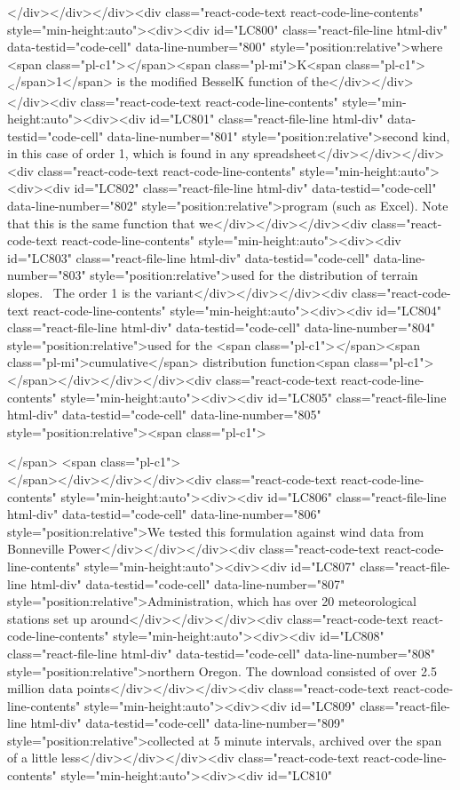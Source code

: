 {{{{{</div></div></div><div class="react-code-text react-code-line-contents" style="min-height:auto"><div><div id="LC800" class="react-file-line html-div" data-testid="code-cell" data-line-number="800" style="position:relative">where <span class="pl-c1">\emph</span>{<span class="pl-mi">K<span class="pl-c1">\textsubscript</span>{1}</span>} is the modified BesselK function of the</div></div></div><div class="react-code-text react-code-line-contents" style="min-height:auto"><div><div id="LC801" class="react-file-line html-div" data-testid="code-cell" data-line-number="801" style="position:relative">second kind, in this case of order 1, which is found in any spreadsheet</div></div></div><div class="react-code-text react-code-line-contents" style="min-height:auto"><div><div id="LC802" class="react-file-line html-div" data-testid="code-cell" data-line-number="802" style="position:relative">program (such as Excel). Note that this is the same function that we</div></div></div><div class="react-code-text react-code-line-contents" style="min-height:auto"><div><div id="LC803" class="react-file-line html-div" data-testid="code-cell" data-line-number="803" style="position:relative">used for the distribution of terrain slopes.~ The order 1 is the variant</div></div></div><div class="react-code-text react-code-line-contents" style="min-height:auto"><div><div id="LC804" class="react-file-line html-div" data-testid="code-cell" data-line-number="804" style="position:relative">used for the <span class="pl-c1">\emph</span>{<span class="pl-mi">cumulative</span>} distribution function<span class="pl-c1">\\</span></div></div></div><div class="react-code-text react-code-line-contents" style="min-height:auto"><div><div id="LC805" class="react-file-line html-div" data-testid="code-cell" data-line-number="805" style="position:relative"><span class="pl-c1">\strut</span> <span class="pl-c1">\\</span></div></div></div><div class="react-code-text react-code-line-contents" style="min-height:auto"><div><div id="LC806" class="react-file-line html-div" data-testid="code-cell" data-line-number="806" style="position:relative">We tested this formulation against wind data from Bonneville Power</div></div></div><div class="react-code-text react-code-line-contents" style="min-height:auto"><div><div id="LC807" class="react-file-line html-div" data-testid="code-cell" data-line-number="807" style="position:relative">Administration, which has over 20 meteorological stations set up around</div></div></div><div class="react-code-text react-code-line-contents" style="min-height:auto"><div><div id="LC808" class="react-file-line html-div" data-testid="code-cell" data-line-number="808" style="position:relative">northern Oregon. The download consisted of over 2.5 million data points</div></div></div><div class="react-code-text react-code-line-contents" style="min-height:auto"><div><div id="LC809" class="react-file-line html-div" data-testid="code-cell" data-line-number="809" style="position:relative">collected at 5 minute intervals, archived over the span of a little less</div></div></div><div class="react-code-text react-code-line-contents" style="min-height:auto"><div><div id="LC810" }}}}}
